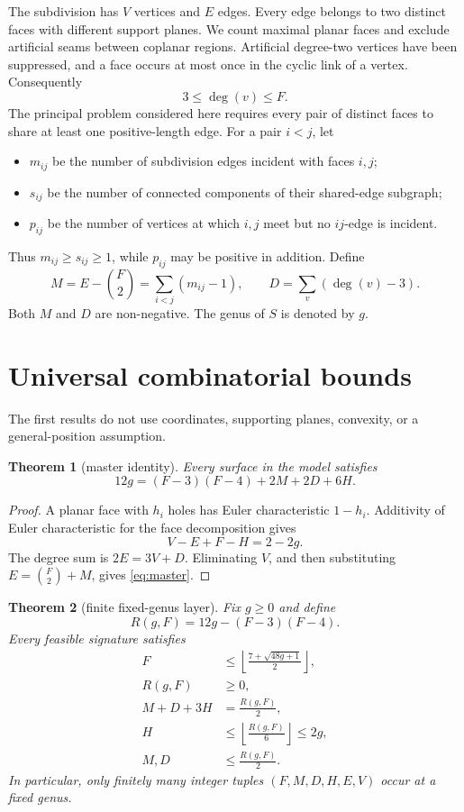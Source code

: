 \documentclass[11pt,a4paper]{article}
\newtheorem{theorem}{Theorem}[section]
\theoremstyle{definition}
\newcommand{\binomFtwo}{\binom{F}{2}}
\begin{document}
The subdivision has $V$ vertices and $E$ edges.  Every edge belongs to two
distinct faces with different support planes. We count maximal planar faces
and exclude artificial seams between coplanar regions. Artificial degree-two
vertices have been suppressed, and a
face occurs at most once in the cyclic link of a vertex.  Consequently
\[
    3\leq \deg(v)\leq F.
\]
The principal problem considered here requires every pair of distinct faces
to share at least one positive-length edge.  For a pair $i<j$, let
\begin{itemize}
\item $m_{ij}$ be the number of subdivision edges incident with faces $i,j$;
\item $s_{ij}$ be the number of connected components of their shared-edge
      subgraph;
\item $p_{ij}$ be the number of vertices at which $i,j$ meet but no
      $ij$-edge is incident.
\end{itemize}
Thus $m_{ij}\geq s_{ij}\geq1$, while $p_{ij}$ may be positive in addition.
Define
\[
  M=E-\binomFtwo=\sum_{i<j}(m_{ij}-1),
  \qquad
  D=\sum_v(\deg(v)-3).
\]
Both $M$ and $D$ are non-negative.  The genus of $S$ is denoted by $g$.

\section{Universal combinatorial bounds}

The first results do not use coordinates, supporting planes, convexity, or a
general-position assumption.

\begin{theorem}[master identity]\label{thm:master}
Every surface in the model satisfies
\begin{equation}\label{eq:master}
  12g=(F-3)(F-4)+2M+2D+6H.
\end{equation}
\end{theorem}

\begin{proof}
A planar face with $h_i$ holes has Euler characteristic $1-h_i$.
Additivity of Euler characteristic for the face decomposition gives
\[
  V-E+F-H=2-2g.
\]
The degree sum is $2E=3V+D$.  Eliminating $V$, and then substituting
$E=\binomFtwo+M$, gives \eqref{eq:master}.
\end{proof}

\begin{theorem}[finite fixed-genus layer]\label{thm:fixed-genus}
Fix $g\geq0$ and define
\[
  R(g,F)=12g-(F-3)(F-4).
\]
Every feasible signature satisfies
\begin{align}
 F &\leq
 \left\lfloor\frac{7+\sqrt{48g+1}}{2}\right\rfloor,
 \label{eq:Fbound}\\
 R(g,F)&\geq0,\label{eq:Rpositive}\\
 M+D+3H&=\frac{R(g,F)}2,\label{eq:budget}\\
 H&\leq\left\lfloor\frac{R(g,F)}6\right\rfloor\leq2g,
 \label{eq:Hgenus}\\
 M,D&\leq\frac{R(g,F)}2.\label{eq:MDgenus}
\end{align}
In particular, only finitely many integer tuples $(F,M,D,H,E,V)$ occur at a
fixed genus.
\end{theorem}
\end{document}
